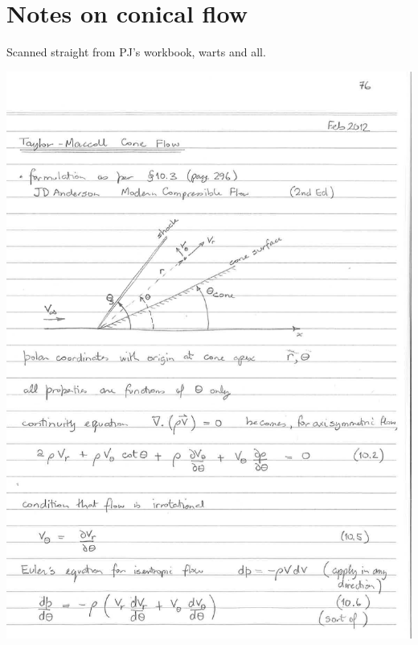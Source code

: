 \documentclass[10pt,a4paper]{article}
\begin{document}
\newpage
\section{Notes on conical flow}
\label{pj-notes-cone-flow}
%
Scanned straight from PJ's workbook, warts and all.

\begin{center}
\includegraphics[width=\textwidth]{../figs/pj-workbook-page-76.png}
\end{center}
\end{document}
